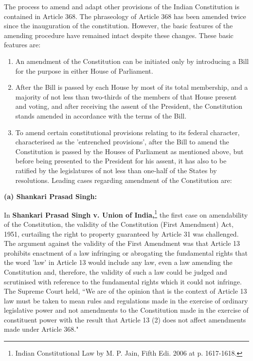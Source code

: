 \begin{multicols}{2}
\noi
The process to amend and adapt other provisions of the Indian Constitution is contained in Article
368. The phraseology of Article 368 has been amended twice since the inauguration of the
constitution. However, the basic features of the amending procedure have remained intact despite
these changes. These basic features are:

\vspace{-.3cm}

\begin{enumerate}[label=(\roman*)]
\itemsep=0pt
\item  An amendment of the Constitution can be initiated only by introducing a Bill for the purpose
in either House of Parliament.

\item After the Bill is passed by each House by most of its total membership, and a majority of not
less than two-thirds of the members of that House present and voting, and after receiving the
assent of the President, the Constitution stands amended in accordance with the terms of the Bill.

\item To amend certain constitutional provisions relating to its federal character, characterised as
the 'entrenched provisions', after the Bill to amend the Constitution is passed by the Houses of
Parliament as mentioned above, but before being presented to the President for his assent, it has
also to be ratified by the legislatures of not less than one-half of the States by resolutions. Leading
cases regarding amendment of the Constitution are:
\end{enumerate}

\vspace{-.3cm}

\noi
{\large \bfseries (a) Shankari Prasad Singh:}

\noi
In \textbf{Shankari Prasad Singh v. Union of India,}\footnote{Indian Constitutional Law by M. P. Jain, Fifth Edi. 2006 at p. 1617-1618.} the first case on amendability of the Constitution, the validity of the Constitution (First Amendment) Act, 1951, curtailing the right to property guaranteed by Article 31 was challenged. The argument against the validity of the First
Amendment was that Article 13 prohibits enactment of a law infringing or abrogating the
fundamental rights that the word 'law' in Article 13 would include any law, even a law amending
the Constitution and, therefore, the validity of such a law could be judged and scrutinised with
reference to the fundamental rights which it could not infringe. The Supreme Court held, “We are
of the opinion that is the context of Article 13 law must be taken to mean rules and regulations
made in the exercise of ordinary legislative power and not amendments to the Constitution made
in the exercise of constituent power with the result that Article 13 (2) does not affect amendments
made under Article 368."


\end{multicols}
